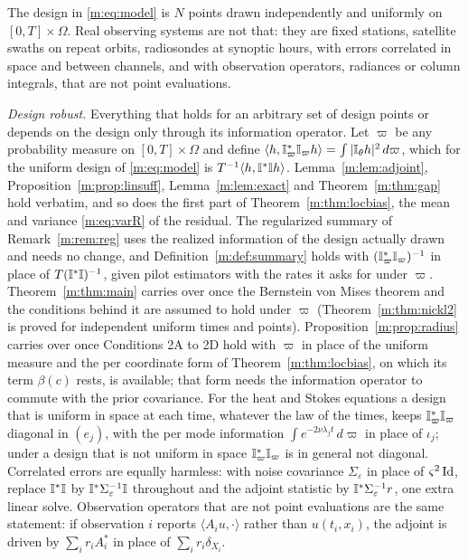 The design in \eqref{m:eq:model} is $N$ points drawn independently and uniformly on $[0,T]\times\Omega$. Real observing systems are not that: they are fixed stations, satellite swaths on repeat orbits, radiosondes at synoptic hours, with errors correlated in space and between channels, and with observation operators, radiances or column integrals, that are not point evaluations.

\emph{Design robust.} Everything that holds for an arbitrary set of design points or depends on the design only through its information operator. Let $\varpi$ be any probability measure on $[0,T]\times\Omega$ and define $\langle h,\mathbb{I}^*_\varpi\mathbb{I}_\varpi h\rangle=\int|\mathbb{I}_\theta h|^2\,d\varpi$, which for the uniform design of \eqref{m:eq:model} is $T^{-1}\langle h,\mathbb{I}^*\mathbb{I} h\rangle$. Lemma~\ref{m:lem:adjoint}, Proposition~\ref{m:prop:linsuff}, Lemma~\ref{m:lem:exact} and Theorem~\ref{m:thm:gap} hold verbatim, and so does the first part of Theorem~\ref{m:thm:locbias}, the mean and variance \eqref{m:eq:varR} of the residual. The regularized summary of Remark~\ref{m:rem:reg} uses the realized information of the design actually drawn and needs no change, and Definition~\ref{m:def:summary} holds with $(\mathbb{I}^*_\varpi\mathbb{I}_\varpi)^{-1}$ in place of $T(\mathbb{I}^*\mathbb{I})^{-1}$, given pilot estimators with the rates it asks for under $\varpi$. Theorem~\ref{m:thm:main} carries over once the Bernstein von Mises theorem and the conditions behind it are assumed to hold under $\varpi$ (Theorem~\ref{m:thm:nickl2} is proved for independent uniform times and points). Proposition~\ref{m:prop:radius} carries over once Conditions 2A to 2D hold with $\varpi$ in place of the uniform measure and the per coordinate form of Theorem~\ref{m:thm:locbias}, on which its term $\beta(c)$ rests, is available; that form needs the information operator to commute with the prior covariance. For the heat and Stokes equations a design that is uniform in space at each time, whatever the law of the times, keeps $\mathbb{I}^*_\varpi\mathbb{I}_\varpi$ diagonal in $(e_j)$, with the per mode information $\int e^{-2\nu\lambda_jt}\,d\varpi$ in place of $\iota_j$; under a design that is not uniform in space $\mathbb{I}^*_\varpi\mathbb{I}_\varpi$ is in general not diagonal. Correlated errors are equally harmless: with noise covariance $\Sigma_\varepsilon$ in place of $\varsigma^2\operatorname{Id}$, replace $\mathbb{I}^*\mathbb{I}$ by $\mathbb{I}^*\Sigma_\varepsilon^{-1}\mathbb{I}$ throughout and the adjoint statistic by $\mathbb{I}^*\Sigma_\varepsilon^{-1}r$, one extra linear solve. Observation operators that are not point evaluations are the same statement: if observation $i$ reports $\langle A_iu,\cdot\rangle$ rather than $u(t_i,x_i)$, the adjoint is driven by $\sum_ir_iA_i^*$ in place of $\sum_ir_i\delta_{X_i}$.

